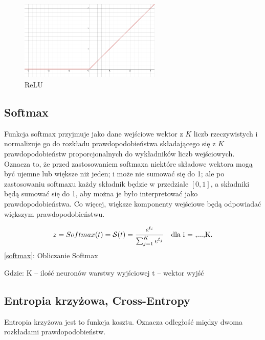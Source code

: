 \documentclass{article}
\begin{document}
\begin{figure}[H]
	\centering
	\includegraphics[width=0.6\textwidth,keepaspectratio=true]{ReLu}
	\caption{
		ReLU
	}
\end{figure}

\subsection{Softmax}
Funkcja softmax przyjmuje jako dane wejściowe wektor z $K$ liczb rzeczywistych i normalizuje go do rozkładu prawdopodobieństwa składającego się z $K$ prawdopodobieństw proporcjonalnych do wykładników liczb wejściowych. Oznacza to, że przed zastosowaniem softmaxa niektóre składowe wektora mogą być ujemne lub większe niż jeden; i może nie sumować się do 1; ale po zastosowaniu softmaxu każdy składnik będzie w przedziale $[0,1]$, a składniki będą sumować się do 1, aby można je było interpretować jako prawdopodobieństwa. Co więcej, większe komponenty wejściowe będą odpowiadać większym prawdopodobieństwu.

\begin{center}
	\begin{equation}	
		z = Softmax(t) = \mathcal{S}(t) = \dfrac{e^{t_i}}{\sum_{j=1}^{K}e^{t_j}}\text{\quad dla i = ,...,K.}
		\label{softmax}
	\end{equation}
	\ref{softmax}: Obliczanie Softmax
\end{center} 

\begin{flushleft}
	Gdzie:\newline
	K -- ilość neuronów warstwy wyjściowej\newline
	t -- wektor wyjść
	
\end{flushleft}

\subsection{Entropia krzyżowa, Cross-Entropy}
Entropia krzyżowa jest to funkcja kosztu. Oznacza odległość między dwoma rozkładami prawdopodobieństw.
\end{document}
